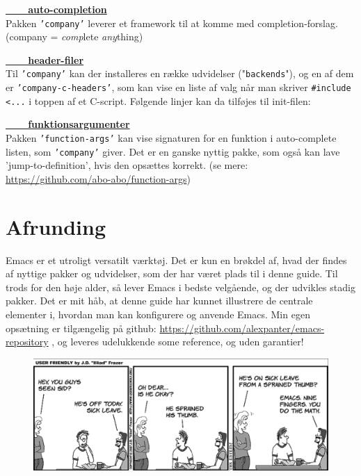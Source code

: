 \documentclass[a4paper, 9pt]{article}
\newcommand{\package}[1]{\texttt{'#1'}}
\newcommand{\example}[1]{\vspace{3mm}\noindent\textbf{\underline{\ \ \ \ #1}}\vspace{2mm}\\}
\newcommand{\lstline}{\vspace{-3mm}\hrulefill\vspace{2mm}\newline}
\newcommand{\customlisting}[3]{\lstline}
\begin{document}
\example{auto-completion}
Pakken \package{company} leverer et framework til at komme med completion-forslag.\newline(company = \textit{comp}lete \textit{any}thing)

\customlisting{ELisp}{init.el}{setup-company.el}

\newpage
\example{header-filer}
Til \package{company} kan der installeres en række udvidelser ("\texttt{backends}"), og en af dem er \package{company-c-headers}, som kan vise en liste af valg når man skriver \texttt{\#include <...} i toppen af et C-script. Følgende linjer kan da tilføjes til init-filen:

\customlisting{ELisp}{init.el}{setup-c-headers.el}


\example{funktionsargumenter}
Pakken \package{function-args} kan vise signaturen for en funktion i auto-complete listen, som \package{company} giver. Det er en ganske nyttig pakke, som også kan lave 'jump-to-definition', hvis den opsættes korrekt. (se mere: \url{https://github.com/abo-abo/function-args})

\customlisting{ELisp}{init.el}{setup-function-args.el}


\newpage
\section*{Afrunding}
Emacs er et utroligt versatilt værktøj. Det er kun en brøkdel af, hvad der findes af nyttige pakker og udvidelser, som der har været plads til i denne guide. Til trods for den høje alder, så lever Emacs i bedste velgående, og der udvikles stadig pakker. Det er mit håb, at denne guide har kunnet illustrere de centrale elementer i, hvordan man kan konfigurere og anvende Emacs. Min egen opsætning er tilgængelig på github: \url{https://github.com/alexpanter/emacs-repository} , og leveres udelukkende some reference, og uden garantier!

\begin{figure}
\centering
\includegraphics[width=13cm]{cartoon.png}
\end{figure}
\end{document}
